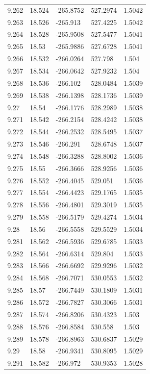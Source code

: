 \begin{tabular}{lllll}
9.262 & 18.524 & -265.8752 & 527.2974 & 1.5042 \\
9.263 & 18.526 & -265.913 & 527.4225 & 1.5042 \\
9.264 & 18.528 & -265.9508 & 527.5477 & 1.5041 \\
9.265 & 18.53 & -265.9886 & 527.6728 & 1.5041 \\
9.266 & 18.532 & -266.0264 & 527.798 & 1.504 \\
9.267 & 18.534 & -266.0642 & 527.9232 & 1.504 \\
9.268 & 18.536 & -266.102 & 528.0484 & 1.5039 \\
9.269 & 18.538 & -266.1398 & 528.1736 & 1.5039 \\
9.27 & 18.54 & -266.1776 & 528.2989 & 1.5038 \\
9.271 & 18.542 & -266.2154 & 528.4242 & 1.5038 \\
9.272 & 18.544 & -266.2532 & 528.5495 & 1.5037 \\
9.273 & 18.546 & -266.291 & 528.6748 & 1.5037 \\
9.274 & 18.548 & -266.3288 & 528.8002 & 1.5036 \\
9.275 & 18.55 & -266.3666 & 528.9256 & 1.5036 \\
9.276 & 18.552 & -266.4045 & 529.051 & 1.5036 \\
9.277 & 18.554 & -266.4423 & 529.1765 & 1.5035 \\
9.278 & 18.556 & -266.4801 & 529.3019 & 1.5035 \\
9.279 & 18.558 & -266.5179 & 529.4274 & 1.5034 \\
9.28 & 18.56 & -266.5558 & 529.5529 & 1.5034 \\
9.281 & 18.562 & -266.5936 & 529.6785 & 1.5033 \\
9.282 & 18.564 & -266.6314 & 529.804 & 1.5033 \\
9.283 & 18.566 & -266.6692 & 529.9296 & 1.5032 \\
9.284 & 18.568 & -266.7071 & 530.0553 & 1.5032 \\
9.285 & 18.57 & -266.7449 & 530.1809 & 1.5031 \\
9.286 & 18.572 & -266.7827 & 530.3066 & 1.5031 \\
9.287 & 18.574 & -266.8206 & 530.4323 & 1.503 \\
9.288 & 18.576 & -266.8584 & 530.558 & 1.503 \\
9.289 & 18.578 & -266.8963 & 530.6837 & 1.5029 \\
9.29 & 18.58 & -266.9341 & 530.8095 & 1.5029 \\
9.291 & 18.582 & -266.972 & 530.9353 & 1.5028 \\

\end{tabular}
